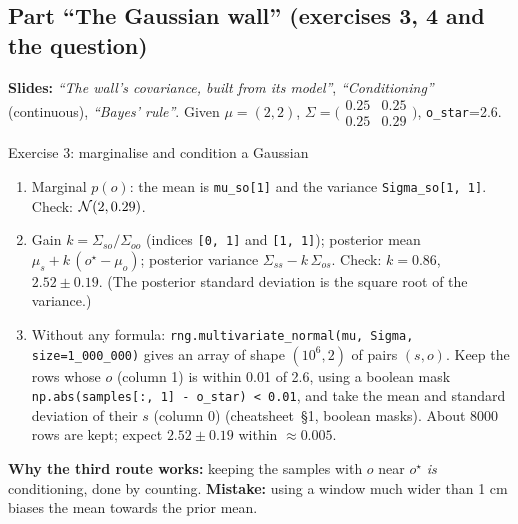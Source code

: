 \documentclass[11pt]{article}
\newcommand{\slide}[1]{\textit{``#1''}}
\newcommand{\psm}[1]{\bigl(\begin{smallmatrix}#1\end{smallmatrix}\bigr)}
\newcommand{\cs}[1]{cheatsheet~\S#1}
\begin{document}
\subsection*{Part ``The Gaussian wall'' (exercises 3, 4 and the question)}
\textbf{Slides:} \slide{The wall's covariance, built from its model}, \slide{Conditioning} (continuous), \slide{Bayes' rule}. Given $\mu=(2,2)$, $\Sigma=\psm{0.25&0.25\\0.25&0.29}$, \texttt{o\_star}=2.6.

\begin{labhelp}{Exercise 3: marginalise and condition a Gaussian}
\begin{enumerate}[nosep]
\item Marginal $p(o)$: the mean is \texttt{mu\_so[1]} and the variance \texttt{Sigma\_so[1, 1]}. Check: $\mathcal{N}(2,0.29)$.
\item Gain $k=\Sigma_{so}/\Sigma_{oo}$ (indices \texttt{[0, 1]} and \texttt{[1, 1]}); posterior mean $\mu_s+k\,(o^\star-\mu_o)$; posterior variance $\Sigma_{ss}-k\,\Sigma_{os}$. Check: $k=0.86$, $2.52\pm0.19$. (The posterior standard deviation is the square root of the variance.)
\item Without any formula: \texttt{rng.multivariate\_normal(mu, Sigma, size=1\_000\_000)} gives an array of shape $(10^6,2)$ of pairs $(s,o)$. Keep the rows whose $o$ (column 1) is within 0.01 of 2.6, using a boolean mask \texttt{np.abs(samples[:, 1] - o\_star) < 0.01}, and take the mean and standard deviation of their $s$ (column 0) (\cs{1}, boolean masks). About 8000 rows are kept; expect $2.52\pm0.19$ within $\approx0.005$.
\end{enumerate}
\textbf{Why the third route works:} keeping the samples with $o$ near $o^\star$ \emph{is} conditioning, done by counting. \textbf{Mistake:} using a window much wider than 1 cm biases the mean towards the prior mean.
\end{labhelp}
\end{document}
